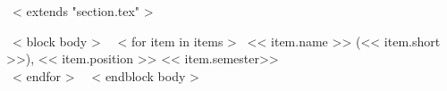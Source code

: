 ~< extends "section.tex" >~

~< block body >~
    ~< for item in items >~
        << item.name >>
        (<< item.short >>),
        << item.position >>
        \hfill
        << item.semester>> \\
    ~< endfor >~
~< endblock body >~
